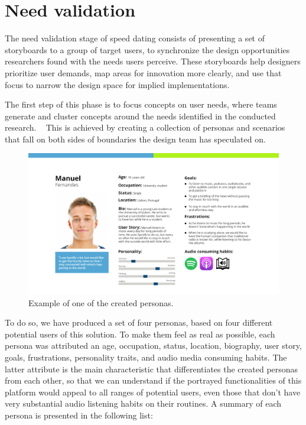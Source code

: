 \section{Need validation}

The need validation stage of speed dating consists of presenting a set of storyboards to a group of target users, to synchronize the design opportunities researchers found with the needs users perceive. These storyboards help designers prioritize user demands, map areas for innovation more clearly, and use that focus to narrow the design space for implied implementations. ~\cite{Davidoff2007}

The first step of this phase is to focus concepts on user needs, where teams generate and cluster concepts around the needs identified in the conducted research. ~\cite{Davidoff2007} This is achieved by creating a collection of personas and scenarios that fall on both sides of boundaries the design team has speculated on. 

\begin{figure}[!h]
    \centering
    \includegraphics[width=\columnwidth]{./Images/persona.png}
    \caption{Example of one of the created personas.}
    \label{fig:persona}
\end{figure}

To do so, we have produced a set of four personas, based on four different potential users of this solution. To make them feel as real as possible, each persona was attributed an age, occupation, status, location, biography, user story, goals, frustrations, personality traits, and audio media consuming habits. The latter attribute is the main characteristic that differentiates the created personas from each other, so that we can understand if the portrayed functionalities of this platform would appeal to all ranges of potential users, even those that don't have very substantial audio listening habits on their routines. A summary of each persona is presented in the following list:

